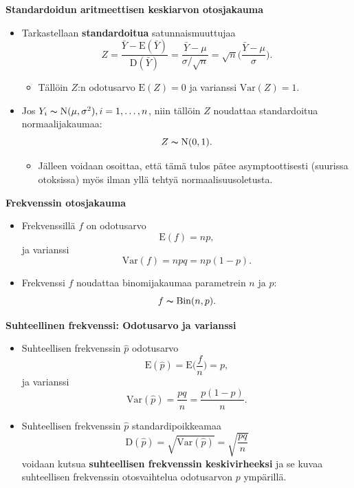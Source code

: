 \documentclass[
]{book}
\providecommand{\tightlist}{%
  \setlength{\itemsep}{0pt}\setlength{\parskip}{0pt}}
\begin{document}
\textbf{Standardoidun aritmeettisen keskiarvon otosjakauma}

\begin{itemize}
\tightlist
\item
  Tarkastellaan \textbf{standardoitua} satunnaismuuttujaa
  \[
  Z = \frac{\bar{Y} - \text{E}(\bar{Y})}{\text{D}(\bar{Y})} = \frac{\bar{Y} - \mu}{\sigma / \sqrt{n}} = \sqrt{n} \Big(\frac{\bar{Y} - \mu}{\sigma}\Big).
  \]

  \begin{itemize}
  \tightlist
  \item
    Tällöin \(Z\):n odotusarvo \(\text{E}(Z) = 0\) ja varianssi \(\mathrm{Var}(Z) = 1\).
  \end{itemize}
\item
  Jos \(Y_i \thicksim \text{N}(\mu, \sigma^2), i=1,\ldots,n\), niin tällöin \(Z\) noudattaa standardoitua normaalijakaumaa:
  \[
  Z \thicksim \text{N}(0,1).
  \]

  \begin{itemize}
  \tightlist
  \item
    Jälleen voidaan osoittaa, että tämä tulos pätee asymptoottisesti (suurissa otoksissa) myös ilman yllä tehtyä normaalisuusoletusta.
  \end{itemize}
\end{itemize}

\textbf{Frekvenssin otosjakauma}

\begin{itemize}
\tightlist
\item
  Frekvenssillä \(f\) on odotusarvo
  \[
  \text{E}(f) = np,
  \]
  ja varianssi
  \[
  \mathrm{Var}(f) = npq = np(1-p).
  \]
\item
  Frekvenssi \(f\) noudattaa binomijakaumaa parametrein \(n\) ja \(p\):
  \[
  f \thicksim \mathrm{Bin}(n,p).
  \]
\end{itemize}

\textbf{Suhteellinen frekvenssi: Odotusarvo ja varianssi}

\begin{itemize}
\item
  Suhteellisen frekvenssin \(\widehat{p}\) odotusarvo
  \[
  \text{E}(\widehat{p}) = \text{E} \Big(\frac{f}{n} \Big) = p,
  \]
  ja varianssi
  \[
  \mathrm{Var}(\widehat{p}) = \frac{pq}{n} = \frac{p(1-p)}{n}.
  \]
\item
  Suhteellisen frekvenssin \(\widehat{p}\) standardipoikkeamaa
  \[
  \text{D}(\widehat{p}) = \sqrt{\mathrm{Var} (\widehat{p})} =  \sqrt{\frac{pq}{n}}
  \]
  voidaan kutsua \textbf{suhteellisen frekvenssin keskivirheeksi} ja se kuvaa suhteellisen frekvenssin otosvaihtelua odotusarvon \(p\) ympärillä.
\end{itemize}
\end{document}

